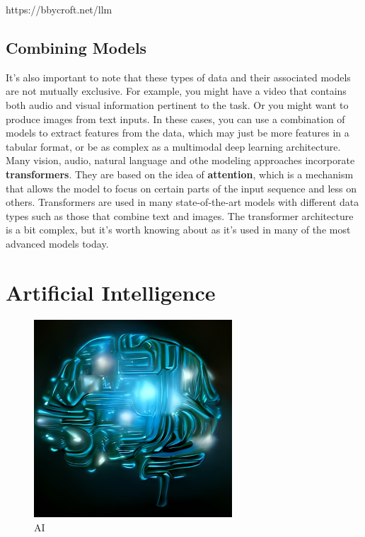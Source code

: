 \documentclass[
  letterpaper,
]{krantz}
\begin{document}
https://bbycroft.net/llm

\subsection{Combining Models}\label{combining-models}

It's also important to note that these types of data and their
associated models are not mutually exclusive. For example, you might
have a video that contains both audio and visual information pertinent
to the task. Or you might want to produce images from text inputs. In
these cases, you can use a combination of models to extract features
from the data, which may just be more features in a tabular format, or
be as complex as a multimodal deep learning architecture. Many vision,
audio, natural language and othe modeling approaches incorporate
\textbf{transformers}. They are based on the idea of \textbf{attention},
which is a mechanism that allows the model to focus on certain parts of
the input sequence and less on others. Transformers are used in many
state-of-the-art models with different data types such as those that
combine text and images. The transformer architecture is a bit complex,
but it's worth knowing about as it's used in many of the most advanced
models today.

\section{Artificial Intelligence}\label{artificial-intelligence}

\begin{figure}

{\centering \includegraphics[width=0.66\textwidth,height=\textheight]{img/ai_by_dalle.jpeg}

}

\caption{AI}

\end{figure}
\end{document}
